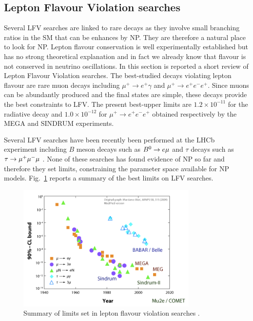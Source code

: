 \subsection{Lepton Flavour Violation searches}

Several LFV searches are linked to rare decays as they involve small branching ratios
in the SM that can be enhances by NP. They are therefore a natural place to look for NP.
Lepton flavour conservation is well experimentally established but has no strong theoretical explanation
and in fact we already know that flavour is not conserved in neutrino oscillations.
In this section is reported a short review of Lepton Flavour Violation searches.
The best-studied decays violating lepton flavour are rare muon decays including $\mu^+\to e^+\gamma$
and $\mu^+\to e^+e^-e^+$. Since muons can be abundantly produced and the final states are simple,
these decays provide the best constraints to LFV. The present best-upper limits are $1.2 \times 10^{-11}$
for the radiative decay and $1.0 \times 10^{-12}$ for $\mu^+\to e^+e^-e^+$ obtained respectively by the
MEGA \cite{} and SINDRUM \cite{} experiments.

Several LFV searches have been recently been performed at the LHCb experiment including $B$ meson
decays such as $B^0\rightarrow e\mu$ \cite{} and $\tau$ decays such as $\tau\rightarrow\mu^+\mu^-\mu$ \cite{}.
None of these searches has found evidence of NP so far and therefore they set limits, constraining
the parameter space available for NP models. Fig.~\ref{fig:LFV_decay} reports a summary of
the best limits on LFV searches.


\begin{figure}[h!]
\label{fig:LFV_decay}
\centering 
\includegraphics[width=0.8\textwidth]{Introduction/figs/LFV.png}
\caption{Summary of limits set in lepton flavour violation searches \cite{}.}
\end{figure}
 